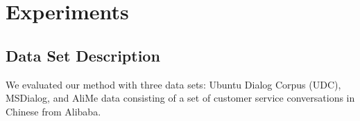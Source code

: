 \section{Experiments}
\label{sec:exps}
 \subsection{Data Set Description}
 \label{sec:data_desc}

 We evaluated our method with three data sets: Ubuntu Dialog Corpus (UDC), MSDialog, and AliMe  data consisting of a set of %
 customer service conversations in Chinese from Alibaba.
